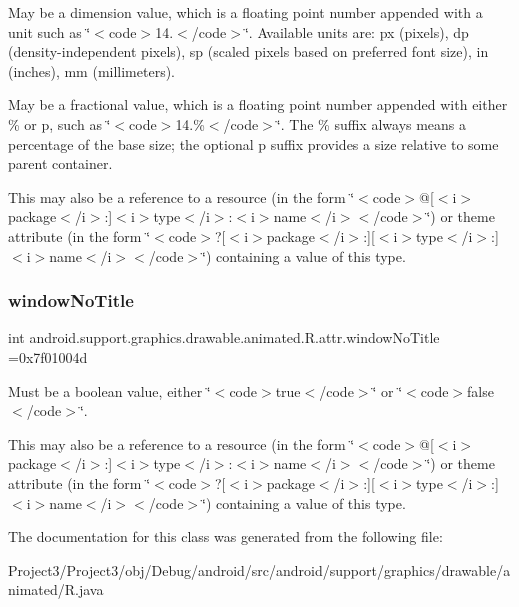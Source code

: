 May be a dimension value, which is a floating point number appended with a unit such as \char`\"{}$<$code$>$14.\+5sp$<$/code$>$\char`\"{}. Available units are\+: px (pixels), dp (density-\/independent pixels), sp (scaled pixels based on preferred font size), in (inches), mm (millimeters). 

May be a fractional value, which is a floating point number appended with either \% or p, such as \char`\"{}$<$code$>$14.\%$<$/code$>$\char`\"{}. The \% suffix always means a percentage of the base size; the optional p suffix provides a size relative to some parent container. 

This may also be a reference to a resource (in the form \char`\"{}$<$code$>$@\mbox{[}$<$i$>$package$<$/i$>$\+:\mbox{]}$<$i$>$type$<$/i$>$\+:$<$i$>$name$<$/i$>$$<$/code$>$\char`\"{}) or theme attribute (in the form \char`\"{}$<$code$>$?\mbox{[}$<$i$>$package$<$/i$>$\+:\mbox{]}\mbox{[}$<$i$>$type$<$/i$>$\+:\mbox{]}$<$i$>$name$<$/i$>$$<$/code$>$\char`\"{}) containing a value of this type. \mbox{\label{classandroid_1_1support_1_1graphics_1_1drawable_1_1animated_1_1R_1_1attr_aa8ad9f246d10bfbada7375d07fc9472c}} 
\subsubsection{\texorpdfstring{window\+No\+Title}{windowNoTitle}}
{\footnotesize\ttfamily int android.\+support.\+graphics.\+drawable.\+animated.\+R.\+attr.\+window\+No\+Title =0x7f01004d\hspace{0.3cm}{\ttfamily [static]}}

Must be a boolean value, either \char`\"{}$<$code$>$true$<$/code$>$\char`\"{} or \char`\"{}$<$code$>$false$<$/code$>$\char`\"{}. 

This may also be a reference to a resource (in the form \char`\"{}$<$code$>$@\mbox{[}$<$i$>$package$<$/i$>$\+:\mbox{]}$<$i$>$type$<$/i$>$\+:$<$i$>$name$<$/i$>$$<$/code$>$\char`\"{}) or theme attribute (in the form \char`\"{}$<$code$>$?\mbox{[}$<$i$>$package$<$/i$>$\+:\mbox{]}\mbox{[}$<$i$>$type$<$/i$>$\+:\mbox{]}$<$i$>$name$<$/i$>$$<$/code$>$\char`\"{}) containing a value of this type. 

The documentation for this class was generated from the following file\+:\begin{DoxyCompactItemize}
\item 
Project3/\+Project3/obj/\+Debug/android/src/android/support/graphics/drawable/animated/R.\+java\end{DoxyCompactItemize}

